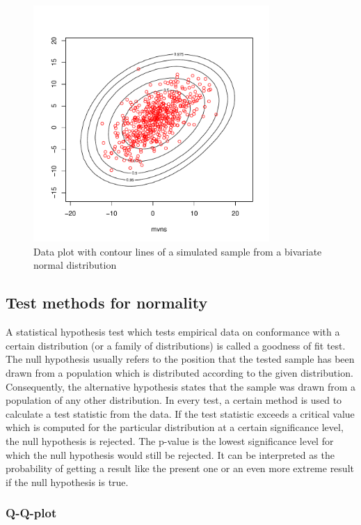 \documentclass[a4paper, 12pt, titlepage, headsepline, listof = totoc, bibliography = totoc, numbers = noenddot]{scrartcl}
\begin{document}
\begin{figure}[h!]
\centering
\includegraphics[width=0.8\textwidth]{report-plotMVNSim}
\caption{Data plot with contour lines of a simulated sample from a bivariate normal distribution}
\label{fig:plotMVNSim}
\end{figure}

\subsection{Test methods for normality}\label{sec:methods}

A statistical hypothesis test which tests empirical data on conformance with a certain distribution (or a family of distributions) is called a goodness of fit test. The null hypothesis usually refers to the position that the tested sample has been drawn from a population which is distributed according to the given distribution. Consequently, the alternative hypothesis states that the sample was drawn from a population of any other distribution. In every test, a certain method is used to calculate a test statistic from the data. If the test statistic exceeds a critical value which is computed for the particular distribution at a certain significance level, the null hypothesis is rejected. The p-value is the lowest significance level for which the null hypothesis would still be rejected. It can be interpreted as the probability of getting a result like the present one or an even more extreme result if the null hypothesis is true.

\subsubsection{Q-Q-plot}\label{sec:qq-theoretical}
\end{document}
